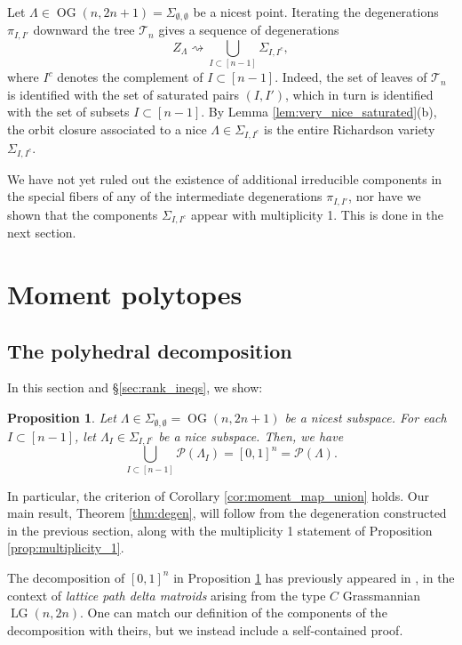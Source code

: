 \documentclass[12pt]{amsart}
\newtheorem{proposition}[definition]{Proposition}
\DeclareMathOperator{\LG}{LG}
\DeclareMathOperator{\OG}{OG}
\newcommand{\cP}{\mathcal{P}}
\newcommand{\cT}{\mathcal{T}}
\begin{document}
Let $\Lambda\in\OG(n,2n+1)=\Sigma_{\emptyset,\emptyset}$ be a nicest point. Iterating the degenerations $\pi_{I,I'}$ downward the tree $\cT_n$ gives a sequence of degenerations
\begin{equation*}
Z_\Lambda \rightsquigarrow \bigcup_{I\subset[n-1]}\Sigma_{I,I^c},
\end{equation*}
where $I^c$ denotes the complement of $I\subset[n-1]$. Indeed, the set of leaves of $\cT_n$ is identified with the set of saturated pairs $(I,I')$, which in turn is identified with the set of subsets $I\subset[n-1]$. By Lemma \ref{lem:very_nice_saturated}(b), the orbit closure associated to a nice $\Lambda\in\Sigma_{I,I^c}$ is the entire Richardson variety $\Sigma_{I,I^c}$.

We have not yet ruled out the existence of additional irreducible components in the special fibers of any of the intermediate degenerations $\pi_{I,I'}$, nor have we shown that the components $\Sigma_{I,I^c}$ appear with multiplicity 1. This is done in the next section.

\section{Moment polytopes}\label{sec:moment_polytopes}

\subsection{The polyhedral decomposition}\label{sec:moment_polytopes_statement}

In this section and \S\ref{sec:rank_ineqs}, we show:

\begin{proposition}\label{prop:polytope_union}
    Let $\Lambda\in\Sigma_{\emptyset,\emptyset}=\OG(n,2n+1)$ be a nicest subspace. For each $I\subset[n-1]$, let $\Lambda_I\in\Sigma_{I,I^c}$ be a nice subspace. Then, we have
    \begin{equation*}
        \bigcup_{I\subset[n-1]}\cP(\Lambda_{I})=[0,1]^n=\cP(\Lambda).
    \end{equation*}
\end{proposition}

In particular, the criterion of Corollary \ref{cor:moment_map_union} holds. Our main result, Theorem \ref{thm:degen}, will follow from the degeneration constructed in the previous section, along with the multiplicity 1 statement of Proposition \ref{prop:multiplicity_1}.

The decomposition of $[0,1]^n$ in Proposition \ref{prop:polytope_union} has previously appeared in \cite[Proposition 6.1]{csvy}, in the context of \emph{lattice path delta matroids} arising from the type $C$ Grassmannian $\LG(n,2n)$. One can match our definition of the components of the decomposition with theirs, but we instead include a self-contained proof.
\end{document}
